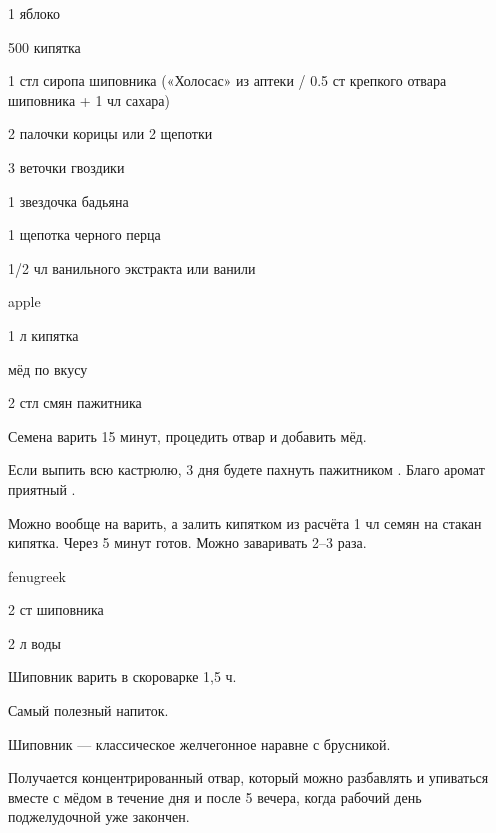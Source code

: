 {
\item 1 яблоко
\item 500 кипятка
\item 1 стл сиропа шиповника («Холосас» из аптеки / 0.5 ст крепкого отвара шиповника + 1 чл сахара)

}{
\item 2 палочки корицы или 2 щепотки
\item 3 веточки гвоздики
\item 1 звездочка бадьяна
\item 1 щепотка черного перца
\item 1/2 чл ванильного экстракта или ванили
}{%
}{}{apple}




{
\item 1 л кипятка
\item мёд по вкусу
}{
\item 2 стл смян пажитника
}{
Семена варить 15 минут, процедить отвар и добавить мёд.
}{
\begin{advice}
\item Если выпить всю кастрюлю, 3 дня будете пахнуть пажитником \faSmileO. Благо аромат приятный \faSmileO.
\item Можно вообще на варить, а залить кипятком из расчёта 1 чл семян на стакан кипятка. Через 5 минут готов. Можно заваривать 2–3 раза. 
\end{advice}}{fenugreek}



{
\item 2 ст шиповника
\item 2 л воды
}{
\item[] 
}{
Шиповник варить в скороварке 1,5 ч.
}{
\begin{advice}
    \item Самый полезный напиток.
    \item Шиповник — классическое желчегонное наравне с брусникой.
\item Получается концентрированный отвар, который можно разбавлять и упиваться вместе с мёдом в течение дня и после 5 вечера, когда рабочий день поджелудочной уже закончен. 

\end{advice}}{}





